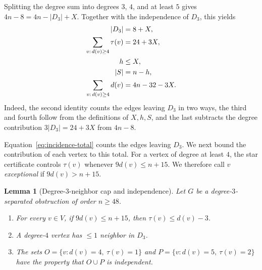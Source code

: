 \documentclass[11pt]{article}
\numberwithin{equation}{section}
\newtheorem{lemma}[theorem]{Lemma}
\theoremstyle{definition}
\theoremstyle{remark}
\begin{document}
Splitting the degree sum into degrees \(3\), \(4\), and at least \(5\) gives
\(4n-8=4n-|D_3|+X\).  Together with the independence of \(D_3\), this yields
\begin{align}
  |D_3|&=8+X,                                      \label{eq:d3-count}\\
  \sum_{v:\,d(v)\ge4}\tau(v)&=24+3X,             \label{eq:incidence-total}\\
  h&\le X,                                         \label{eq:h-le-X}\\
  |S|&=n-h,                                        \notag\\
  \sum_{v:\,d(v)\ge4}d(v)&=4n-32-3X.            \label{eq:high-degree-sum}
\end{align}
Indeed, the second identity counts the edges leaving \(D_3\) in two ways, the
third and fourth follow from the definitions of \(X,h,S\), and the last
subtracts the degree contribution \(3|D_3|=24+3X\) from \(4n-8\).

Equation~\eqref{eq:incidence-total} counts the edges leaving \(D_3\).  We
next bound the contribution of each vertex to this total.  For a vertex
of degree at least \(4\), the star certificate controls \(\tau(v)\)
whenever \(9d(v)\le n+15\).  We therefore call \(v\)
\emph{exceptional} if \(9d(v)>n+15\).

\begin{lemma}[Degree-\(3\)-neighbor cap and independence]\label{lem:incidence-cap}
Let \(G\) be a degree-\(3\)-separated obstruction of order \(n\ge48\).
\begin{enumerate}[label=\textup{(\roman*)}]
  \item For every \(v\in V\), if \(9d(v)\le n+15\), then
  \(\tau(v)\le d(v)-3\).
  \item A degree-\(4\) vertex has \(\le1\) neighbor in \(D_3\).
  \item The sets \(O=\{v:d(v)=4,\ \tau(v)=1\}\) and
  \(P=\{v:d(v)=5,\ \tau(v)=2\}\) have the property that \(O\cup P\) is
  independent.
\end{enumerate}
\end{lemma}
\end{document}
